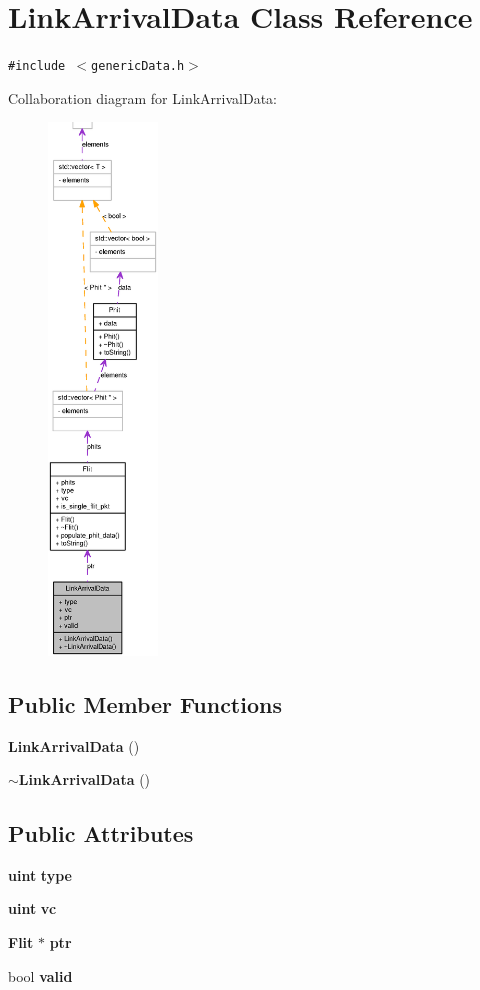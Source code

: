 \section{LinkArrivalData Class Reference}
\label{classLinkArrivalData}
{\tt \#include $<$genericData.h$>$}

Collaboration diagram for LinkArrivalData:\nopagebreak
\begin{figure}[H]
\begin{center}
\leavevmode
\includegraphics[height=400pt]{classLinkArrivalData__coll__graph}
\end{center}
\end{figure}
\subsection*{Public Member Functions}
\begin{CompactItemize}
\item 
{\bf LinkArrivalData} ()
\item 
{\bf $\sim$LinkArrivalData} ()
\end{CompactItemize}
\subsection*{Public Attributes}
\begin{CompactItemize}
\item 
{\bf uint} {\bf type}
\item 
{\bf uint} {\bf vc}
\item 
{\bf Flit} $\ast$ {\bf ptr}
\item 
bool {\bf valid}
\end{CompactItemize}


